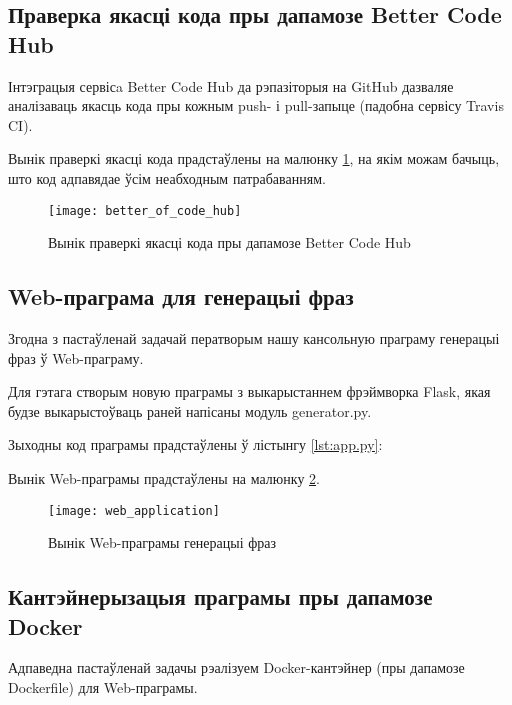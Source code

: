 \vspace{-\baselineskip}
\subsection{Праверка якасці кода пры дапамозе Better Code Hub}

Інтэграцыя сервісa Better Code Hub да рэпазіторыя на GitHub
дазваляе аналізаваць якасць кода пры кожным push- і pull-запыце
(падобна сервісу Travis CI).

Вынік праверкі якасці кода прадстаўлены на малюнку
\ref{figure:Better Code Hub}, на якім можам бачыць,
што код адпавядае ўсім неабходным патрабаванням.


\begin{figure}[h!]
    \centering
    \texttt{[image: better\_of\_code\_hub]}
    \caption{Вынік праверкі якасці кода пры дапамозе Better Code Hub}
    \label{figure:Better Code Hub} 
\end{figure}

\subsection{Web-праграма для генерацыі фраз}

Згодна з пастаўленай задачай ператворым нашу кансольную праграму
генерацыі фраз ў Web-праграму.

Для гэтага створым новую праграмы з выкарыстаннем фрэймворка Flask,
якая будзе выкарыстоўваць раней напісаны модуль generator.py.

Зыходны код праграмы прадстаўлены ў лістынгу \ref{lst:app.py}:



Вынік Web-праграмы прадстаўлены на малюнку \ref{figure:Web application}.

\begin{figure}[h!]
    \centering
    \texttt{[image: web\_application]}
    \caption{Вынік Web-праграмы генерацыі фраз}
    \label{figure:Web application} 
\end{figure}

\subsection{Кантэйнерызацыя праграмы пры дапамозе Docker}

Адпаведна пастаўленай задачы рэалізуем Docker-кантэйнер
(пры дапамозе Dockerfile) для Web-праграмы.

